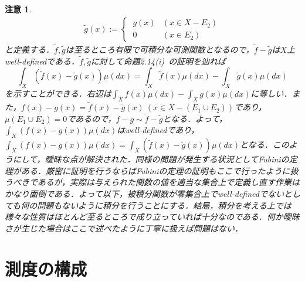 \documentclass[a4paper,11pt]{jsarticle}
\newtheorem{attention}{注意}
\begin{document}
\begin{attention}
\begin{eqnarray*}
\widetilde{g}(x):=\begin{cases}
\displaystyle
{\ }g(x) & (x\in X-E_2) \\
{\ }0 & (x\in E_2)
\end{cases}
\end{eqnarray*}
と定義する．$\widetilde{f},\widetilde{g}$は至るところ有限で可積分な可測関数となるので，$\widetilde{f}-\widetilde{g}$は$X$上well-definedである．$\widetilde{f},\widetilde{g}$に対して命題2.14(i){\ }の証明を辿れば
\begin{equation*}
\int_X(\widetilde{f}(x)-\widetilde{g}(x))\mu(dx)=\int_X\widetilde{f}(x)\mu(dx)-\int_X\widetilde{g}(x)\mu(dx)
\end{equation*}
を示すことができる．右辺は$\int_Xf(x)\mu(dx)-\int_Xg(x)\mu(dx)$に等しい．また，$f(x)-g(x)=\widetilde{f}(x)-\widetilde{g}(x){\ }(x\in X-(E_1\cup E_2))$であり，$\mu(E_1\cup E_2)=0$であるので，$f-g\sim \widetilde{f}-\widetilde{g}$となる．よって，$\int_X(f(x)-g(x))\mu(dx)$はwell-definedであり，$\int_X(f(x)-g(x))\mu(dx)=\int_X(\widetilde{f}(x)-\widetilde{g}(x))\mu(dx)$となる．このようにして，曖昧な点が解決された．同様の問題が発生する状況としてFubiniの定理がある．厳密に証明を行うならばFubiniの定理の証明もここで行ったように扱うべきであるが，実際は与えられた関数の値を適当な集合上で定義し直す作業はかなり面倒である．よって以下，被積分関数が零集合上でwell-definedでないとしても何の問題もないように積分を行うことにする．結局，積分を考える上では様々な性質はほとんど至るところで成り立っていれば十分なのである．何か曖昧さが生じた場合はここで述べたように丁寧に扱えば問題はない．
\end{attention}
%
%
%
%
\section{測度の構成}
\end{document}
